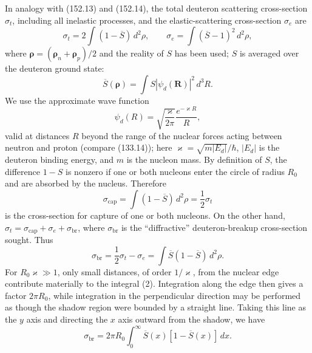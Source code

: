 In analogy with (152.13) and (152.14), the total deuteron scattering cross-section $\sigma_t$, including all inelastic processes, and the elastic-scattering cross-section $\sigma_e$ are
\[
 \sigma_t=2\int(1-\overline S)\,d^2\rho,
 \qquad
 \sigma_e=\int(\overline S-1)^2\,d^2\rho,
\]
where $\boldsymbol\rho=(\boldsymbol\rho_n+\boldsymbol\rho_p)/2$ and the reality of $S$ has been used; $S$ is averaged over the deuteron ground state:
\[
 \overline S(\boldsymbol\rho)=\int S|\psi_d(\mathbf R)|^2\,d^3R.
\]
We use the approximate wave function
\[
 \psi_d(R)=\sqrt{\frac{\varkappa}{2\pi}}\frac{e^{-\varkappa R}}R,
\]
valid at distances $R$ beyond the range of the nuclear forces acting between neutron and proton (compare (133.14)); here $\varkappa=\sqrt{m|E_d|}/\hbar$, $|E_d|$ is the deuteron binding energy, and $m$ is the nucleon mass. By definition of $S$, the difference $1-S$ is nonzero if one or both nucleons enter the circle of radius $R_0$ and are absorbed by the nucleus. Therefore
\begin{equation}
 \sigma_{\mathrm{cap}}=\int(1-\overline S)\,d^2\rho=\frac12\sigma_t
 \tag{1}
\end{equation}
is the cross-section for capture of one or both nucleons. On the other hand, $\sigma_t=\sigma_{\mathrm{cap}}+\sigma_e+\sigma_{\mathrm{br}}$, where $\sigma_{\mathrm{br}}$ is the ``diffractive'' deuteron-breakup cross-section sought. Thus
\begin{equation}
 \sigma_{\mathrm{br}}=\frac12\sigma_t-\sigma_e=\int\overline S(1-\overline S)\,d^2\rho.
 \tag{2}
\end{equation}
For $R_0\varkappa\gg1$, only small distances, of order $1/\varkappa$, from the nuclear edge contribute materially to the integral (2). Integration along the edge then gives a factor $2\pi R_0$, while integration in the perpendicular direction may be performed as though the shadow region were bounded by a straight line. Taking this line as the $y$ axis and directing the $x$ axis outward from the shadow, we have
\[
 \sigma_{\mathrm{br}}=2\pi R_0\int_0^\infty\overline S(x)[1-\overline S(x)]\,dx.
\]

